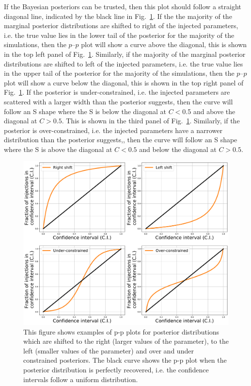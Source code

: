 If the Bayesian posteriors can be trusted, then this plot should follow a straight
diagonal line, indicated by the black line in
Fig.~\ref{par_est:results:ppplot_example}.  If the the majority of the marginal posterior
distributions are shifted to right of the injected parameters, i.e. the true value lies in
the lower tail of the posterior for the majority of the simulations, then the $p$--$p$ plot will show a curve above
the diagonal, this is shown in the top left
panel of Fig.~\ref{par_est:results:ppplot_example}.  Similarly, if the majority of the marginal posterior distributions are shifted to
left of the injected parameters, i.e. the true value
lies in the upper tail of the posterior for the majority of the simulations,
then the $p$--$p$ plot will show a curve below the diagonal, this is shown in the
top right panel of Fig.~\ref{par_est:results:ppplot_example}.  If the posterior is
under-constrained, i.e. the injected parameters are scattered with a larger width than the posterior suggests, then the curve will follow an S shape
where the S is below the diagonal at $C < 0$.5 and above the diagonal at $C >
0.5$. This is shown in the third panel of
Fig.~\ref{par_est:results:ppplot_example}.  Similarly, if the posterior is over-constrained, i.e. the injected parameters have a narrower distribution than the posterior suggests,, then the curve will follow an S shape where the S is
above the diagonal at $C < 0.5$ and below the diagonal at $C> 0.5$.
%
\begin{figure}[ht]
    \centering
    \includegraphics[width=0.9\linewidth]{C5_parameter/ppplot_examples.pdf}
    \caption[$p$--$p$ plot examples]{This figure shows examples of p-p plots for
posterior distributions which are shifted to the right (larger values of the
parameter), to the left (smaller values of the parameter) and over and under
constrained posteriors. The black curve shows the p-p plot when the posterior
distribution is perfectly recovered, i.e. the confidence intervals follow a
uniform distribution.}
\label{par_est:results:ppplot_example}
\end{figure}

